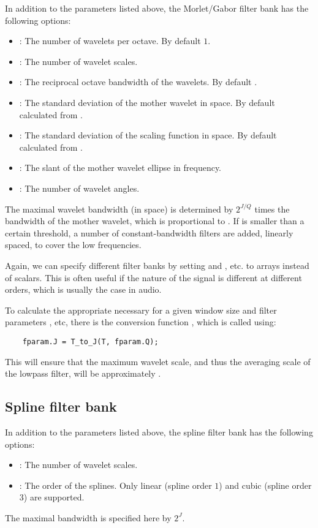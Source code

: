 \documentclass[twocolumn]{article}
\begin{document}
In addition to the parameters listed above, the Morlet/Gabor filter bank has the following options:
\begin{itemize}
	\item {}: The number of wavelets per octave. By default $1$.
	\item {}: The number of wavelet scales.
	\item {}: The reciprocal octave bandwidth of the wavelets. By default .
	\item {}: The standard deviation of the mother wavelet in space. By default calculated from .
	\item {}: The standard deviation of the scaling function in space. By default calculated from .
	\item {}: The slant of the mother wavelet ellipse in frequency.
	\item {}: The number of wavelet angles.
\end{itemize}
The maximal wavelet bandwidth (in space) is determined by $2^{J/Q}$ times the bandwidth of the mother wavelet, which is proportional to . If  is smaller than a certain threshold, a number of constant-bandwidth filters are added, linearly spaced, to cover the low frequencies.

Again, we can specify different filter banks by setting  and , etc. to arrays instead of scalars. This is often useful if the nature of the signal is different at different orders, which is usually the case in audio.

To calculate the appropriate  necessary for a given window size  and filter parameters , etc, there is the conversion function , which is called using:
\begin{lstlisting}
	fparam.J = T_to_J(T, fparam.Q);
\end{lstlisting}
This will ensure that the maximum wavelet scale, and thus the averaging scale of the lowpass filter, will be approximately .

\subsection{Spline filter bank}

In addition to the parameters listed above, the spline filter bank has the following options:
\begin{itemize}
	\item {}: The number of wavelet scales.
	\item {}: The order of the splines. Only linear (spline order $1$) and cubic (spline order $3$) are supported.
\end{itemize}
The maximal bandwidth is specified here by $2^J$.
\end{document}
